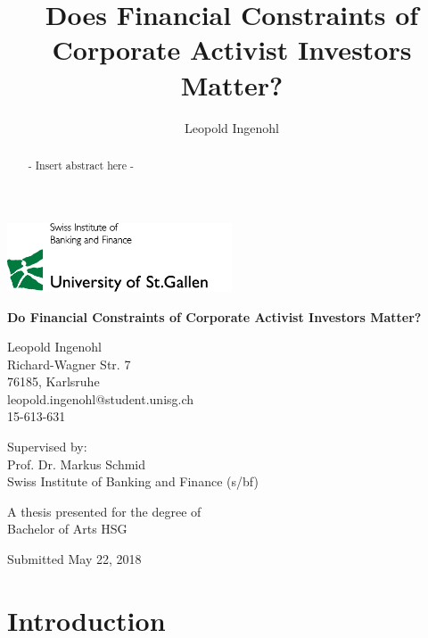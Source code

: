 \documentclass[12pt]{article}
\title{Does Financial Constraints of Corporate Activist Investors Matter?}
\author{Leopold Ingenohl}
\newcounter{savepage}
\begin{document}
\begin{titlepage}
    \begin{center}
       
        \includegraphics[width=0.5\textwidth]{Logo.jpg}
       
        \vspace*{1.5cm}
		\huge
        \textbf{Do Financial Constraints of Corporate Activist Investors Matter?}

        \vspace{1.5cm}
		\normalsize
        Leopold Ingenohl\\
        Richard-Wagner Str. 7\\
        76185, Karlsruhe\\
        leopold.ingenohl@student.unisg.ch\\
        15-613-631

        \vspace{1.5cm}
        Supervised by:\\
        Prof. Dr. Markus Schmid\\
        Swiss Institute of Banking and Finance (s/bf)\\
        \vfill

        A thesis presented for the degree of\\
        Bachelor of Arts HSG

        \vspace{0.8cm}

        Submitted May 22, 2018

	\end{center}
	
\end{titlepage}

\cleardoublepage
{}
\begin{abstract}
	\centering
	- Insert abstract here -
\end{abstract}

\pagebreak

\tableofcontents
\listoftables
\listoffigures

\cleardoublepage
{}

\section{Introduction}
\end{document}
